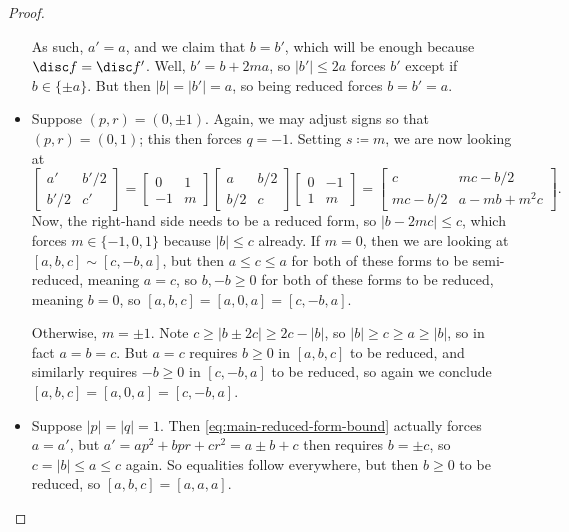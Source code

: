 \documentclass[../notes.tex]{subfiles}
\begin{document}
\begin{proof}
\begin{itemize}
		As such, $a'=a$, and we claim that $b=b'$, which will be enough because $\disc f=\disc f'$. Well, $b'=b+2ma$, so $\left|b'\right|\le 2a$ forces $b'$ except if $b\in\{\pm a\}$. But then $\left|b\right|=\left|b'\right|=a$, so being reduced forces $b=b'=a$.

		\item Suppose $(p,r)=(0,\pm1)$. Again, we may adjust signs so that $(p,r)=(0,1)$; this then forces $q=-1$. Setting $s\coloneqq m$, we are now looking at
		\[\begin{bmatrix}
			a' & b'/2 \\
			b'/2 & c'
		\end{bmatrix}=\begin{bmatrix}
			0 & 1 \\
			-1 & m
		\end{bmatrix}\begin{bmatrix}
			a & b/2 \\
			b/2 & c
		\end{bmatrix}\begin{bmatrix}
			0 & -1 \\
			1 & m
		\end{bmatrix}=\begin{bmatrix}
			c & mc-b/2 \\
			mc-b/2 & a-mb+m^2c
		\end{bmatrix}.\]
		Now, the right-hand side needs to be a reduced form, so $\left|b-2mc\right|\le c$, which forces $m\in\{-1,0,1\}$ because $\left|b\right|\le c$ already. If $m=0$, then we are looking at $[a,b,c]\sim[c,-b,a]$, but then $a\le c\le a$ for both of these forms to be semi-reduced, meaning $a=c$, so $b,-b\ge0$ for both of these forms to be reduced, meaning $b=0$, so $[a,b,c]=[a,0,a]=[c,-b,a]$.

		Otherwise, $m=\pm1$. Note $c\ge\left|b\pm2c\right|\ge2c-\left|b\right|$, so $\left|b\right|\ge c\ge a\ge\left|b\right|$, so in fact $a=b=c$. But $a=c$ requires $b\ge0$ in $[a,b,c]$ to be reduced, and similarly requires $-b\ge0$ in $[c,-b,a]$ to be reduced, so again we conclude $[a,b,c]=[a,0,a]=[c,-b,a]$.

		\item Suppose $\left|p\right|=\left|q\right|=1$. Then \eqref{eq:main-reduced-form-bound} actually forces $a=a'$, but $a'=ap^2+bpr+cr^2=a\pm b+c$ then requires $b=\pm c$, so $c=\left|b\right|\le a\le c$ again. So equalities follow everywhere, but then $b\ge0$ to be reduced, so $[a,b,c]=[a,a,a]$.


\end{itemize}
\end{proof}
\end{document}
